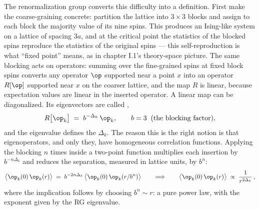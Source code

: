 The renormalization group converts this difficulty into a definition. First
make the coarse-graining concrete: partition the lattice into $3\times3$
blocks and assign to each block the majority value of its nine spins. This
produces an Ising-like system on a lattice of spacing $3a$, and at the
critical point the statistics of the blocked spins reproduce the statistics
of the original spins --- this self-reproduction is what ``fixed point''
means, as in chapter I.1's theory-space picture. The same blocking acts on
operators: summing over the fine-grained spins at fixed block spins converts
any operator $\op$ supported near a point $x$ into an operator $R[\op]$
supported near $x$ on the coarser lattice, and the map $R$ is linear, because
expectation values are linear in the inserted operator. A linear map can be
diagonalized. Its eigenvectors are called ,
\begin{equation}
R\big[\op_k\big] \;=\; b^{-\Delta_k}\, \op_k ,
\qquad b = 3 \;\;\text{(the blocking factor)},
\label{eq:rg-eigenvector}
\end{equation}
and the eigenvalue defines the  $\Delta_k$. The
reason this is the right notion is that eigenoperators, and only they, have
homogeneous correlation functions. Applying the blocking $n$ times inside a
two-point function multiplies each insertion by $b^{-n\Delta_k}$ and reduces
the separation, measured in lattice units, by $b^n$:
\begin{equation}
\big\langle \op_k(0)\,\op_k(r) \big\rangle
\;=\; b^{-2n\Delta_k}\,\big\langle \op_k(0)\,\op_k(r/b^n) \big\rangle
\qquad\Longrightarrow\qquad
\big\langle \op_k(0)\,\op_k(r) \big\rangle \;\propto\;
\frac{1}{r^{2\Delta_k}}\,,
\label{eq:rg-power-law}
\end{equation}
where the implication follows by choosing $b^n \sim r$: a pure power law,
with the exponent given by the RG eigenvalue.

